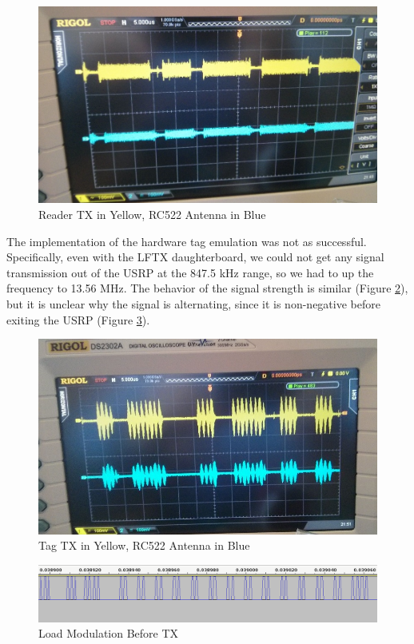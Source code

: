 \documentclass[fleqn,10pt]{SelfArx} %
\begin{document}
\begin{figure}[h]
  \includegraphics[width=\linewidth]{img/readertx}
  \caption{Reader TX in Yellow, RC522 Antenna in Blue}
  \label{fig:readertx}
\end{figure}


The implementation of the hardware tag emulation was not as successful. Specifically, even with the LFTX daughterboard, we could not get any signal transmission out of the USRP at the 847.5 kHz range, so we had to up the frequency to 13.56 MHz. The behavior of the signal strength is similar (Figure \ref{fig:tagtx}), but it is unclear why the signal is alternating, since it is non-negative before exiting the USRP (Figure \ref{fig:load}).

\begin{figure}[h]
  \includegraphics[width=\linewidth]{img/tagtx}
  \caption{Tag TX in Yellow, RC522 Antenna in Blue}
  \label{fig:tagtx}
\end{figure}

\begin{figure}[h]
  \includegraphics[width=\linewidth]{img/load}
  \caption{Load Modulation Before TX}
  \label{fig:load}
\end{figure}
\end{document}
